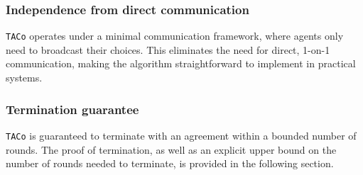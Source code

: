 \subsubsection{Independence from direct communication}
\texttt{TACo} operates under a minimal communication framework, where agents only need to broadcast their choices. This eliminates the need for direct, 1-on-1 communication, making the algorithm straightforward to implement in practical systems.

\subsubsection{Termination guarantee}
\texttt{TACo} is guaranteed to terminate with an agreement within a bounded number of rounds. The proof of termination, as well as an explicit upper bound on the number of rounds needed to terminate, is provided in the following section.